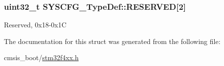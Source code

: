 \subsubsection[{\texorpdfstring{R\+E\+S\+E\+R\+V\+ED}{RESERVED}}]{\setlength{\rightskip}{0pt plus 5cm}uint32\+\_\+t S\+Y\+S\+C\+F\+G\+\_\+\+Type\+Def\+::\+R\+E\+S\+E\+R\+V\+ED\mbox{[}2\mbox{]}}\hypertarget{struct_s_y_s_c_f_g___type_def_a43926e6d31a976a0018b2d1f5c92645d}{}\label{struct_s_y_s_c_f_g___type_def_a43926e6d31a976a0018b2d1f5c92645d}
Reserved, 0x18-\/0x1C 

The documentation for this struct was generated from the following file\+:\begin{DoxyCompactItemize}
\item 
cmsis\+\_\+boot/\hyperlink{stm32f4xx_8h}{stm32f4xx.\+h}\end{DoxyCompactItemize}
